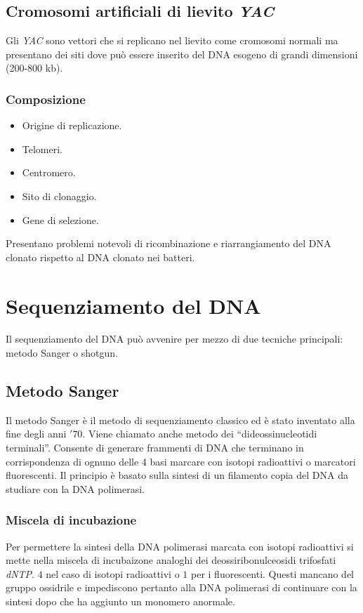 	\subsection{Cromosomi artificiali di lievito \emph{YAC}}
	Gli \emph{YAC} sono vettori che si replicano nel lievito come cromosomi normali ma presentano dei siti dove pu\`o essere inserito del DNA esogeno di grandi dimensioni (200-800 kb).
	
		\subsubsection{Composizione}
		\begin{multicols}{2}
			\begin{itemize}
				\item Origine di replicazione.
				\item Telomeri.
				\item Centromero.
				\item Sito di clonaggio.
				\item Gene di selezione.
			\end{itemize}
		\end{multicols}
		Presentano problemi notevoli di ricombinazione e riarrangiamento del DNA clonato rispetto al DNA clonato nei batteri.

\section{Sequenziamento del DNA}
Il sequenziamento del DNA pu\`o avvenire per mezzo di due tecniche principali: metodo Sanger o shotgun.

	\subsection{Metodo Sanger}
	Il metodo Sanger \`e il metodo di sequenziamento classico ed \`e stato inventato alla fine degli anni $'70$. 
	Viene chiamato anche metodo dei ``dideossinucleotidi terminali''. 
	Consente di generare frammenti di DNA che terminano in corrispondenza di ognuno delle 4 basi marcare con isotopi radioattivi o marcatori fluorescenti. 
	Il principio \`e basato sulla sintesi di un filamento copia del DNA da studiare con la DNA polimerasi.

		\subsubsection{Miscela di incubazione}
		Per permettere la sintesi della DNA polimerasi marcata con isotopi radioattivi si mette nella miscela di incubaizone analoghi dei deossiribonulceosidi trifosfati \emph{dNTP}.
		$4$ nel caso di isotopi radioattivi o $1$ per i fluorescenti.
		Questi mancano del gruppo ossidrile e impediscono pertanto alla DNA polimerasi di continuare con la sintesi dopo che ha aggiunto un monomero anormale.

